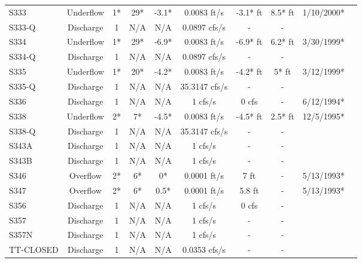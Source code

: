 \begin{table}[h]
\begin{tabular}{@{}lccccccccc@{}}
{S333}          & Underflow     & 1*       & 29*         & -3.1*        & 0.0083 ft/s    & -3.1* ft        & 8.5* ft    & 1/10/2000*  \\
{S333-Q}        & Discharge     & 1        & N/A         & N/A          & 0.0897 cfs/s   & -               & -          &             \\
{S334}          & Underflow     & 1*       & 29*         & -6.9*        & 0.0083 ft/s    & -6.9* ft        & 6.2* ft    & 3/30/1999*  \\
{S334-Q}        & Discharge     & 1        & N/A         & N/A          & 0.0897 cfs/s   & -               & -          &             \\
{S335}          & Underflow     & 1*       & 20*         & -4.2*        & 0.0083 ft/s    & -4.2* ft        & 5* ft      & 3/12/1999*  \\
{S335-Q}        & Discharge     & 1        & N/A         & N/A          & 35.3147 cfs/s  & -               & -          &             \\
{S336}          & Discharge     & 1        & N/A         & N/A          & 1 cfs/s        &  0 cfs          & -          & 6/12/1994*  \\
{S338}          & Underflow     & 2*       & 7*          & -4.5*        & 0.0083 ft/s    &  -4.5* ft       & 2.5* ft    & 12/5/1995*  \\
{S338-Q}        & Discharge     & 1        & N/A         & N/A          & 35.3147 cfs/s  &  -              & -          &             \\
{S343A}         & Discharge     & 1        & N/A         & N/A          & 1 cfs/s        &  -              & -          &             \\
{S343B}         & Discharge     & 1        & N/A         & N/A          & 1 cfs/s        &  -              & -          &             \\
{S346}          & Overflow      & 2*       & 6*          & 0*           & 0.0001 ft/s    &  7 ft           & -          & 5/13/1993*  \\
{S347}          & Overflow      & 2*       & 6*          & 0.5*         & 0.0001 ft/s    &  5.8 ft         & -          & 5/13/1993*  \\
{S356}          & Discharge     & 1        & N/A         & N/A          & 1 cfs/s        &  0 cfs          & -          &             \\
{S357}          & Discharge     & 1        & N/A         & N/A          & 1 cfs/s        &  -              & -          &             \\
{S357N}         & Discharge     & 1        & N/A         & N/A          & 1 cfs/s        &  -              & -          &             \\
{TT-CLOSED}     & Discharge     & 1        & N/A         & N/A          & 0.0353 cfs/s   &  -              & -          &             \\
\hline
\end{tabular}


\end{table}
